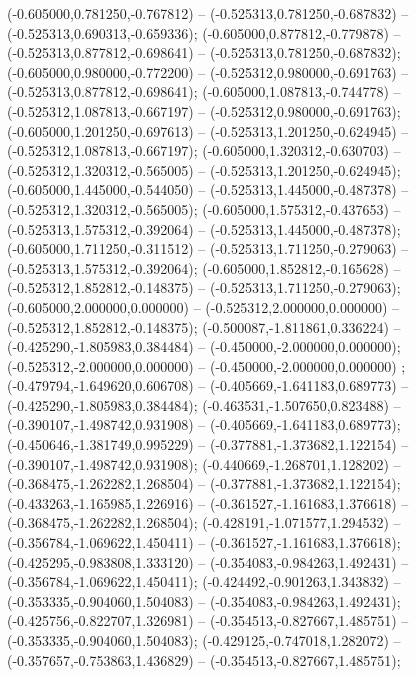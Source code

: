  (-0.605000,0.781250,-0.767812) -- (-0.525313,0.781250,-0.687832) -- (-0.525313,0.690313,-0.659336);
 (-0.605000,0.877812,-0.779878) -- (-0.525313,0.877812,-0.698641) -- (-0.525313,0.781250,-0.687832);
 (-0.605000,0.980000,-0.772200) -- (-0.525312,0.980000,-0.691763) -- (-0.525313,0.877812,-0.698641);
 (-0.605000,1.087813,-0.744778) -- (-0.525312,1.087813,-0.667197) -- (-0.525312,0.980000,-0.691763);
 (-0.605000,1.201250,-0.697613) -- (-0.525313,1.201250,-0.624945) -- (-0.525312,1.087813,-0.667197);
 (-0.605000,1.320312,-0.630703) -- (-0.525312,1.320312,-0.565005) -- (-0.525313,1.201250,-0.624945);
 (-0.605000,1.445000,-0.544050) -- (-0.525313,1.445000,-0.487378) -- (-0.525312,1.320312,-0.565005);
 (-0.605000,1.575312,-0.437653) -- (-0.525313,1.575312,-0.392064) -- (-0.525313,1.445000,-0.487378);
 (-0.605000,1.711250,-0.311512) -- (-0.525313,1.711250,-0.279063) -- (-0.525313,1.575312,-0.392064);
 (-0.605000,1.852812,-0.165628) -- (-0.525312,1.852812,-0.148375) -- (-0.525313,1.711250,-0.279063);
 (-0.605000,2.000000,0.000000) -- (-0.525312,2.000000,0.000000) -- (-0.525312,1.852812,-0.148375);
 (-0.500087,-1.811861,0.336224) -- (-0.425290,-1.805983,0.384484) -- (-0.450000,-2.000000,0.000000);
 (-0.525312,-2.000000,0.000000) -- (-0.450000,-2.000000,0.000000) ;
 (-0.479794,-1.649620,0.606708) -- (-0.405669,-1.641183,0.689773) -- (-0.425290,-1.805983,0.384484);
 (-0.463531,-1.507650,0.823488) -- (-0.390107,-1.498742,0.931908) -- (-0.405669,-1.641183,0.689773);
 (-0.450646,-1.381749,0.995229) -- (-0.377881,-1.373682,1.122154) -- (-0.390107,-1.498742,0.931908);
 (-0.440669,-1.268701,1.128202) -- (-0.368475,-1.262282,1.268504) -- (-0.377881,-1.373682,1.122154);
 (-0.433263,-1.165985,1.226916) -- (-0.361527,-1.161683,1.376618) -- (-0.368475,-1.262282,1.268504);
 (-0.428191,-1.071577,1.294532) -- (-0.356784,-1.069622,1.450411) -- (-0.361527,-1.161683,1.376618);
 (-0.425295,-0.983808,1.333120) -- (-0.354083,-0.984263,1.492431) -- (-0.356784,-1.069622,1.450411);
 (-0.424492,-0.901263,1.343832) -- (-0.353335,-0.904060,1.504083) -- (-0.354083,-0.984263,1.492431);
 (-0.425756,-0.822707,1.326981) -- (-0.354513,-0.827667,1.485751) -- (-0.353335,-0.904060,1.504083);
 (-0.429125,-0.747018,1.282072) -- (-0.357657,-0.753863,1.436829) -- (-0.354513,-0.827667,1.485751);
